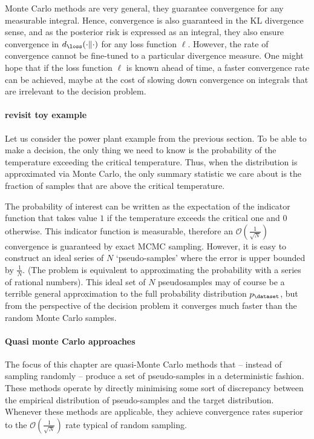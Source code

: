 Monte Carlo methods are very general, they guarantee convergence for any measurable integral. Hence, convergence is also guaranteed in the KL divergence sense, and as the posterior risk is expressed as an integral, they also ensure convergence in $d_\loss(\cdot\|\cdot)$ for any loss function $\ell$. However, the rate of convergence cannot be fine-tuned to a particular divergence measure. One might hope that if the loss function $\ell$ is known ahead of time, a faster convergence rate can be achieved, maybe at the cost of slowing down convergence on integrals that are irrelevant to the decision problem.

\paragraph{revisit toy example} Let us consider the power plant example from the previous section. To be able to make a decision, the only thing we need to know is the probability of the temperature exceeding the critical temperature. Thus, when the distribution is approximated via Monte Carlo, the only summary statistic we care about is the fraction of samples that are above the critical temperature.

The probability of interest can be written as the expectation of the indicator function that takes value $1$ if the temperature exceeds the critical one and $0$ otherwise. This indicator function is measurable, therefore an $\mathcal{O}(\frac{1}{\sqrt{N}})$ convergence is guaranteed by exact MCMC sampling.
However, it is easy to construct an ideal series of $N$ `pseudo-samples' where the error is upper bounded by $\frac{1}{N}$. (The problem is equivalent to approximating the probability with a series of rational numbers). This ideal set of $N$ pseudosamples may of course be a terrible general approximation to the full probability distribution $p_\dataset$, but from the perspective of the decision problem it converges much faster than the random Monte Carlo samples.


\paragraph{Quasi monte Carlo approaches}

 The focus of this chapter are quasi-Monte Carlo methods that -- instead of sampling randomly -- produce a set of pseudo-samples in a deterministic fashion. These methods operate by directly minimising some sort of discrepancy between the empirical distribution of pseudo-samples and the target distribution. Whenever these methods are applicable, they achieve convergence rates superior to the $\mathcal{O}(\frac{1}{\sqrt{N}})$ rate typical of random sampling.

